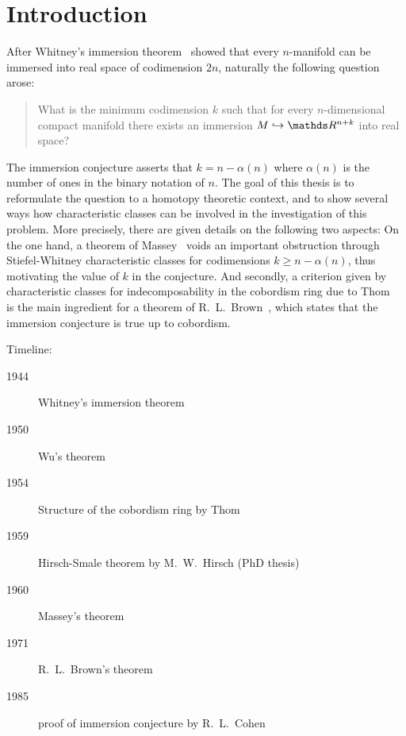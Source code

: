 % 

\chapter*{Introduction} %
After Whitney's immersion theorem~\cite{whitneyimmersiontheorem}
showed that every $n$-manifold can be immersed into real space of
codimension $2n$, naturally the following question arose:
\begin{quote}
  What is the minimum codimension $k$ such that for every
  $n$-dimensional compact manifold there exists an
  immersion $M\immto\R^{n+k}$ into real space?
\end{quote}
The immersion conjecture asserts that $k=n-\alpha(n)$ where
$\alpha(n)$ is the number of ones in the binary notation of $n$.
The goal of this thesis is to reformulate the question to a homotopy
theoretic context, and to show several ways how characteristic classes
can be involved in the investigation of this problem.
More precisely, there are given details on the following two aspects:
On the one hand, a theorem of Massey~\cite{massey} voids an important
obstruction through Stiefel-Whitney characteristic classes for
codimensions $k\geq n-\alpha(n)$, thus motivating the value of $k$ in
the conjecture.
And secondly, a criterion given by characteristic classes for
indecomposability in the cobordism ring due to Thom~\cite{thom}
is the main ingredient for a theorem of R.~L.~Brown~\cite{brown},
which states that the immersion conjecture is true up to cobordism.


Timeline:
\begin{description}
\item[1944] Whitney's immersion theorem \cite{whitneyimmersiontheorem}
\item[1950] Wu's theorem \cite{wu}
\item[1954] Structure of the cobordism ring by Thom \cite{thomfrench}
\item[1959] Hirsch-Smale theorem by M.~W.~Hirsch \cite{hirschimmersions} (PhD thesis)
\item[1960] Massey's theorem \cite{massey}
\item[1971] R.~L.~Brown's theorem \cite{brown}
\item[1985] proof of immersion conjecture by R.~L.~Cohen \cite{immersionconj}
\end{description}

